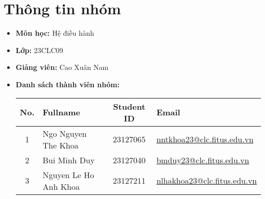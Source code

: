 \section{Thông tin nhóm}
\begin{itemize}
	\item \textbf{Môn học: } Hệ điều hành
	\item \textbf{Lớp: } 23CLC09
	\item \textbf{Giảng viên: } Cao Xuân Nam
	\item \textbf{Danh sách thành viên nhóm: }
	      \begin{center}
		      \renewcommand{\arraystretch}{1.5}
		      \begin{tabular}{|c|l|c|l|}
			      \hline
			      \textbf{No.} & \textbf{Fullname}     & \textbf{Student ID} & \textbf{Email}                                                         \\\hline
			      1            & Ngo Nguyen The Khoa   & 23127065            & \href{mailto:nntkhoa23@clc.fitus.edu.vn}{nntkhoa23@clc.fitus.edu.vn}   \\\hline
			      2            & Bui Minh Duy          & 23127040            & \href{mailto:bmduy23@clc.fitus.edu.vn}{bmduy23@clc.fitus.edu.vn}       \\\hline
			      3            & Nguyen Le Ho Anh Khoa & 23127211            & \href{mailto:nlhakhoa23@clc.fitus.edu.vn}{nlhakhoa23@clc.fitus.edu.vn} \\\hline
		      \end{tabular}
	      \end{center}
\end{itemize}
